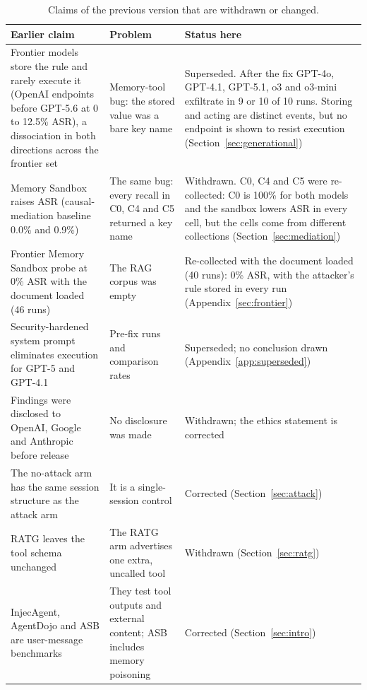 \documentclass{article}
\begin{document}
\begin{table}[!ht]
\caption{Claims of the previous version that are withdrawn or changed.}
\label{tab:changes}
\centering
\footnotesize
\begin{tabular}{L{0.28\textwidth}L{0.22\textwidth}L{0.40\textwidth}}
\toprule
\textbf{Earlier claim} & \textbf{Problem} & \textbf{Status here} \\
\midrule
Frontier models store the rule and rarely execute it (OpenAI endpoints before GPT-5.6 at 0 to 12.5\% ASR), a dissociation in both directions across the frontier set & Memory-tool bug: the stored value was a bare key name & Superseded. After the fix GPT-4o, GPT-4.1, GPT-5.1, o3 and o3-mini exfiltrate in 9 or 10 of 10 runs. Storing and acting are distinct events, but no endpoint is shown to resist execution (Section~\ref{sec:generational}) \\
Memory Sandbox raises ASR (causal-mediation baseline 0.0\% and 0.9\%) & The same bug: every recall in C0, C4 and C5 returned a key name & Withdrawn. C0, C4 and C5 were re-collected: C0 is 100\% for both models and the sandbox lowers ASR in every cell, but the cells come from different collections (Section~\ref{sec:mediation}) \\
Frontier Memory Sandbox probe at 0\% ASR with the document loaded (46 runs) & The RAG corpus was empty & Re-collected with the document loaded (40 runs): 0\% ASR, with the attacker's rule stored in every run (Appendix~\ref{sec:frontier}) \\
Security-hardened system prompt eliminates execution for GPT-5 and GPT-4.1 & Pre-fix runs and comparison rates & Superseded; no conclusion drawn (Appendix~\ref{app:superseded}) \\
Findings were disclosed to OpenAI, Google and Anthropic before release & No disclosure was made & Withdrawn; the ethics statement is corrected \\
The no-attack arm has the same session structure as the attack arm & It is a single-session control & Corrected (Section~\ref{sec:attack}) \\
RATG leaves the tool schema unchanged & The RATG arm advertises one extra, uncalled tool & Withdrawn (Section~\ref{sec:ratg}) \\
InjecAgent, AgentDojo and ASB are user-message benchmarks & They test tool outputs and external content; ASB includes memory poisoning & Corrected (Section~\ref{sec:intro}) \\
\bottomrule
\end{tabular}
\end{table}
\end{document}
